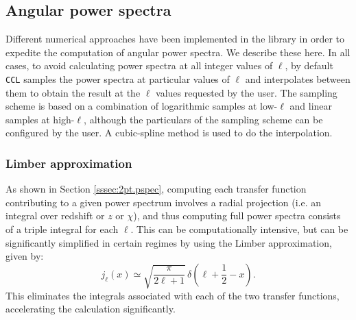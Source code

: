 \documentclass[\docopts]{\docclass}
\newcommand{\ccl}{{\tt CCL}\xspace}
\begin{document}
\subsection{Angular power spectra}

Different numerical approaches have been implemented in the library in order to expedite the computation of angular power spectra. We describe these here. In all cases, to avoid calculating power spectra at all integer values of $\ell$, by default \ccl samples the power spectra at particular values of $\ell$ and interpolates between them to obtain the result at the $\ell$ values requested by the user. The sampling scheme is based on a combination of logarithmic samples at low-$\ell$ and linear samples at high-$\ell$, although the particulars of the sampling scheme can be configured by the user. A cubic-spline method is used to do the interpolation.

\subsubsection{Limber approximation}

As shown in Section \ref{sssec:2pt.pspec}, computing each transfer function contributing to a given power spectrum involves a radial projection (i.e. an integral over redshift or $z$ or $\chi$), and thus computing full power spectra consists of a triple integral for each $\ell$. This can be computationally intensive, but can be significantly simplified in certain regimes by using the Limber approximation, given by:
\begin{equation}
 j_\ell(x)\simeq\sqrt{\frac{\pi}{2\ell+1}}\,\delta\left(\ell+\frac{1}{2}-x\right).
\end{equation}
This eliminates the integrals associated with each of the two transfer functions, accelerating the calculation significantly.
\end{document}
